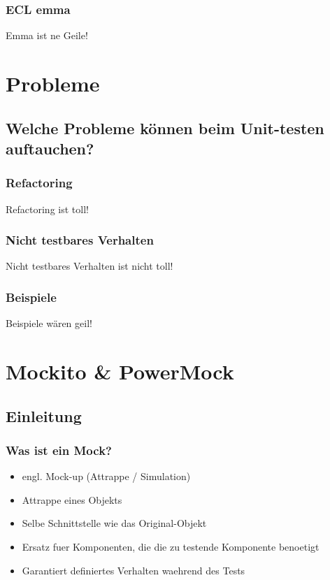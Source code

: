 \documentclass{beamer}
\begin{document}
			\begin{frame}
				\frametitle{ECL emma}
				Emma ist ne Geile!
			\end{frame}

	
	\section{Probleme}

		\subsection{Welche Probleme können beim Unit-testen auftauchen?}
		
			\begin{frame}
				\frametitle{Refactoring}
				Refactoring ist toll!
			\end{frame}

			\begin{frame}
				\frametitle{Nicht testbares Verhalten}
				Nicht testbares Verhalten ist nicht toll!
			\end{frame}

			\begin{frame}
				\frametitle{Beispiele}
				Beispiele wären geil!
			\end{frame}

	
	\section{Mockito \& PowerMock}
		\subsection{Einleitung}
			\begin{frame}
				\frametitle{Was ist ein Mock?}
				\begin{itemize}
					\item{engl. Mock-up (Attrappe / Simulation)}
					\item{Attrappe eines Objekts}
					\item{Selbe Schnittstelle wie das Original-Objekt}
					\item{Ersatz fuer Komponenten, die die zu testende Komponente benoetigt}
					\item{Garantiert definiertes Verhalten waehrend des Tests}
				\end{itemize}

			\end{frame}
\end{document}

